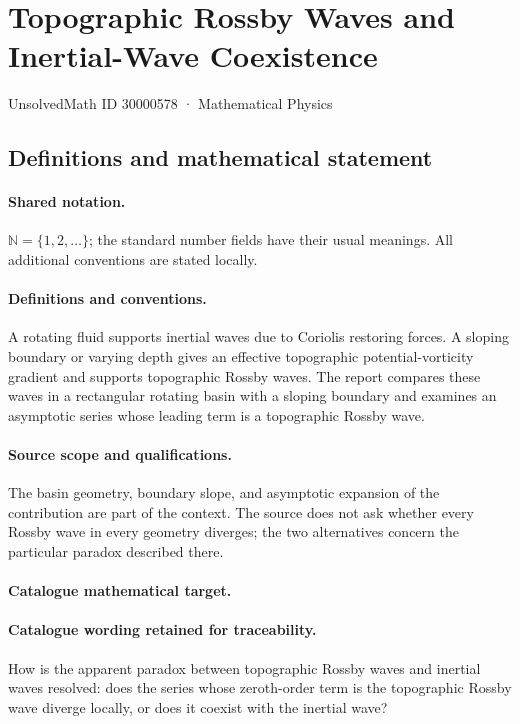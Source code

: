\documentclass[11pt]{article}
\begin{document}
\setcounter{section}{30000577}
\section{Topographic Rossby Waves and Inertial-Wave Coexistence}\label{30000578}
{\small UnsolvedMath ID 30000578 · Mathematical Physics}
\subsection{Definitions and mathematical statement}

\paragraph{Shared notation.}$\mathbb N=\{1,2,\ldots\}$; the standard number fields have their usual meanings. All additional conventions are stated locally.


\paragraph{Definitions and conventions.} A rotating fluid supports inertial waves due to Coriolis restoring forces. A sloping boundary or varying depth gives an effective topographic potential-vorticity gradient and supports topographic Rossby waves. The report compares these waves in a rectangular rotating basin with a sloping boundary and examines an asymptotic series whose leading term is a topographic Rossby wave.

\paragraph{Source scope and qualifications.} The basin geometry, boundary slope, and asymptotic expansion of the contribution are part of the context. The source does not ask whether every Rossby wave in every geometry diverges; the two alternatives concern the particular paradox described there.

\paragraph{Catalogue mathematical target.}
\paragraph{Catalogue wording retained for traceability.}
How is the apparent paradox between topographic Rossby waves and inertial waves resolved: does the series whose zeroth-order term is the topographic Rossby wave diverge locally, or does it coexist with the inertial wave?
\end{document}
